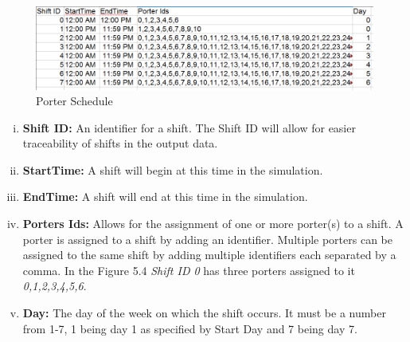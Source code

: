 \documentclass[paper=letter, fontsize=10pt]{scrartcl}
\numberwithin{equation}{section}		%
\numberwithin{figure}{section}			%
\numberwithin{table}{section}				%
\begin{document}
	\begin{figure}[!htbp]
	\begin{center}
		\includegraphics[width=1\columnwidth, height=0.5\textheight, keepaspectratio]{Schedule.png}
		\caption{Porter Schedule}
	\end{center}
	\end{figure}
	
	\begin{enumerate}[(i)]
		\item \textbf{Shift ID:} An identifier for a shift.  The Shift ID will allow for easier traceability of shifts in the output data.
		\item \textbf{StartTime:} A shift will begin at this time in the simulation.
		\item \textbf{EndTime:} A shift will end at this time in the simulation.
		\item \textbf{Porters Ids:} Allows for the assignment of one or more porter(s) to a shift.  A porter is assigned to a shift by adding an identifier.  Multiple porters can be assigned to the same shift by adding multiple identifiers each separated by a comma.  In the Figure 5.4 \textit{Shift ID 0} has three  porters assigned to it \textit{0,1,2,3,4,5,6}.
		\item \textbf{Day:} The day of the week on which the shift occurs.  It must be a number from 1-7, 1 being day 1 as specified by Start Day and 7 being day 7.
	\end{enumerate}
\end{document}
